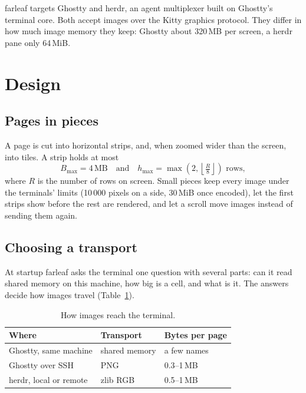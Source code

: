 \documentclass[12pt]{article}
\begin{document}
farleaf targets Ghostty and herdr, an agent multiplexer built on Ghostty's
terminal core. Both accept images over the Kitty graphics protocol. They differ
in how much image memory they keep: Ghostty about 320\,MB per screen, a herdr
pane only 64\,MiB.

\section{Design}

\subsection{Pages in pieces}

A page is cut into horizontal strips, and, when zoomed wider than the screen,
into tiles. A strip holds at most
\begin{equation}
  B_{\max} = 4\,\text{MB} \quad\text{and}\quad
  h_{\max} = \max\!\left(2, \left\lfloor \tfrac{R}{8} \right\rfloor\right)
  \text{ rows},
\end{equation}
where $R$ is the number of rows on screen. Small pieces keep every image under
the terminals' limits (10\,000 pixels on a side, 30\,MiB once encoded), let the
first strips show before the rest are rendered, and let a scroll move images
instead of sending them again.

\subsection{Choosing a transport}

At startup farleaf asks the terminal one question with several parts: can it
read shared memory on this machine, how big is a cell, and what is it. The
answers decide how images travel (Table~\ref{tab:transports}).

\begin{table}[h]
  \centering
  \begin{tabular}{lll}
    \toprule
    Where & Transport & Bytes per page \\
    \midrule
    Ghostty, same machine & shared memory & a few names \\
    Ghostty over SSH & PNG & 0.3--1\,MB \\
    herdr, local or remote & zlib RGB & 0.5--1\,MB \\
    \bottomrule
  \end{tabular}
  \caption{How images reach the terminal.}
  \label{tab:transports}
\end{table}
\end{document}
